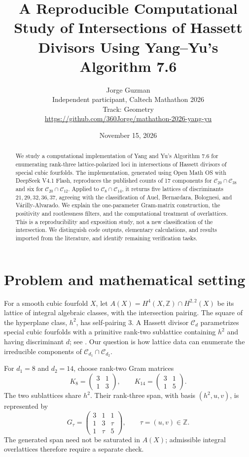\documentclass[11pt]{article}
\title{A Reproducible Computational Study of Intersections of Hassett Divisors Using Yang--Yu's Algorithm 7.6}
\author{Jorge Guzman\\Independent participant, Caltech Mathathon 2026\\Track: Geometry\\\small\url{https://github.com/360Jorge/mathathon-2026-yang-yu}}
\date{November 15, 2026}
\begin{document}
\maketitle
\begin{abstract}
We study a computational implementation of Yang and Yu's Algorithm 7.6 for enumerating rank-three lattice-polarized loci in intersections of Hassett divisors of special cubic fourfolds. The implementation, generated using Open Math OS with DeepSeek V4.1 Flash, reproduces the published counts of 17 components for $\mathcal C_{20}\cap\mathcal C_{38}$ and six for $\mathcal C_{20}\cap\mathcal C_{12}$. Applied to $\mathcal C_8\cap\mathcal C_{14}$, it returns five lattices of discriminants $21,29,32,36,37$, agreeing with the classification of Auel, Bernardara, Bolognesi, and V\'arilly-Alvarado. We explain the one-parameter Gram-matrix construction, the positivity and rootlessness filters, and the computational treatment of overlattices. This is a reproducibility and exposition study, not a new classification of the intersection. We distinguish code outputs, elementary calculations, and results imported from the literature, and identify remaining verification tasks.
\end{abstract}
\section{Problem and mathematical setting}
For a smooth cubic fourfold $X$, let $A(X)=H^4(X,\mathbb Z)\cap H^{2,2}(X)$ be its lattice of integral algebraic classes, with the intersection pairing. The square of the hyperplane class, $h^2$, has self-pairing $3$. A Hassett divisor $\mathcal C_d$ parametrizes special cubic fourfolds with a primitive rank-two sublattice containing $h^2$ and having discriminant $d$; see \cite{Hassett,YangYu}. Our question is how lattice data can enumerate the irreducible components of $\mathcal C_{d_1}\cap\mathcal C_{d_2}$.

For $d_1=8$ and $d_2=14$, choose rank-two Gram matrices
\[
K_8=\begin{pmatrix}3&1\\1&3\end{pmatrix},\qquad K_{14}=\begin{pmatrix}3&1\\1&5\end{pmatrix}.
\]
The two sublattices share $h^2$. Their rank-three span, with basis $(h^2,u,v)$, is represented by
\begin{equation}\label{eq:gram}
G_\tau=\begin{pmatrix}3&1&1\\1&3&\tau\\1&\tau&5\end{pmatrix},\qquad \tau=(u,v)\in\mathbb Z.
\end{equation}
The generated span need not be saturated in $A(X)$; admissible integral overlattices therefore require a separate check.
\end{document}
